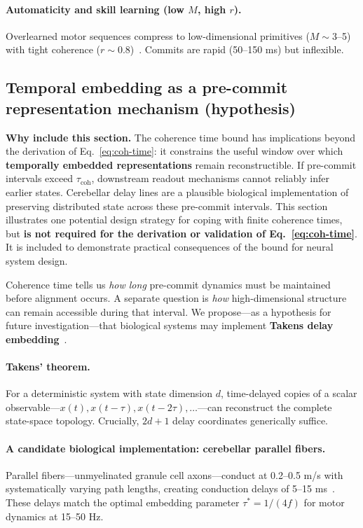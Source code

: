 \documentclass[12pt]{article}
\begin{document}
\paragraph{Automaticity and skill learning (low $M$, high $r$).}
Overlearned motor sequences compress to low-dimensional primitives ($M \sim 3$--5) with tight coherence ($r \sim 0.8$)~\cite{wolpert1998}. Commits are rapid (50--150 ms) but inflexible.

\subsection{Temporal embedding as a pre-commit representation mechanism (hypothesis)}

\textbf{Why include this section.}
The coherence time bound has implications beyond the derivation of Eq.~\ref{eq:coh-time}:
it constrains the useful window over which \textbf{temporally embedded representations}
remain reconstructible. If pre-commit intervals exceed $\tau_{\mathrm{coh}}$,
downstream readout mechanisms cannot reliably infer earlier states.
Cerebellar delay lines are a plausible biological implementation of preserving
distributed state across these pre-commit intervals. This section illustrates
one potential design strategy for coping with finite coherence times, but
\textbf{is not required for the derivation or validation of Eq.~\ref{eq:coh-time}}.
It is included to demonstrate practical consequences of the bound for
neural system design.

Coherence time tells us \emph{how long} pre-commit dynamics must be maintained before alignment occurs. A separate question is \emph{how} high-dimensional structure can remain accessible during that interval. We propose---as a hypothesis for future investigation---that biological systems may implement \textbf{Takens delay embedding}~\cite{takens1981}.

\paragraph{Takens' theorem.}
For a deterministic system with state dimension $d$, time-delayed copies of a scalar observable---$x(t), x(t-\tau), x(t-2\tau), \ldots$---can reconstruct the complete state-space topology. Crucially, $2d+1$ delay coordinates generically suffice.

\paragraph{A candidate biological implementation: cerebellar parallel fibers.}
Parallel fibers---unmyelinated granule cell axons---conduct at 0.2--0.5 m/s with systematically varying path lengths, creating conduction delays of 5--15 ms~\cite{braitenberg1958,llinas1982,wyatt2005}. These delays match the optimal embedding parameter $\tau^* = 1/(4f)$ for motor dynamics at 15--50 Hz.
\end{document}
